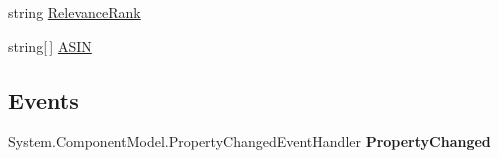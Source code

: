 \begin{DoxyCompactItemize}
\begin{DoxyCompactList}\small\item\em \end{DoxyCompactList}\item 
\hypertarget{class_price___comparison_1_1amazon_1_1ecs_1_1_search_results_map_search_index_af6e5f8f9ff792820d5994dfb654a0446}{string \hyperlink{class_price___comparison_1_1amazon_1_1ecs_1_1_search_results_map_search_index_af6e5f8f9ff792820d5994dfb654a0446}{Relevance\-Rank}}\label{class_price___comparison_1_1amazon_1_1ecs_1_1_search_results_map_search_index_af6e5f8f9ff792820d5994dfb654a0446}

\begin{DoxyCompactList}\small\item\em \end{DoxyCompactList}\item 
\hypertarget{class_price___comparison_1_1amazon_1_1ecs_1_1_search_results_map_search_index_a1b2c1390dbbab581bd010c1fb3f0d82a}{string\mbox{[}$\,$\mbox{]} \hyperlink{class_price___comparison_1_1amazon_1_1ecs_1_1_search_results_map_search_index_a1b2c1390dbbab581bd010c1fb3f0d82a}{A\-S\-I\-N}}\label{class_price___comparison_1_1amazon_1_1ecs_1_1_search_results_map_search_index_a1b2c1390dbbab581bd010c1fb3f0d82a}

\begin{DoxyCompactList}\small\item\em \end{DoxyCompactList}\end{DoxyCompactItemize}
\subsection*{Events}
\begin{DoxyCompactItemize}
\item 
\hypertarget{class_price___comparison_1_1amazon_1_1ecs_1_1_search_results_map_search_index_ae538746b79d387add90226c493f0ea5d}{System.\-Component\-Model.\-Property\-Changed\-Event\-Handler {\bfseries Property\-Changed}}\label{class_price___comparison_1_1amazon_1_1ecs_1_1_search_results_map_search_index_ae538746b79d387add90226c493f0ea5d}

\end{DoxyCompactItemize}
